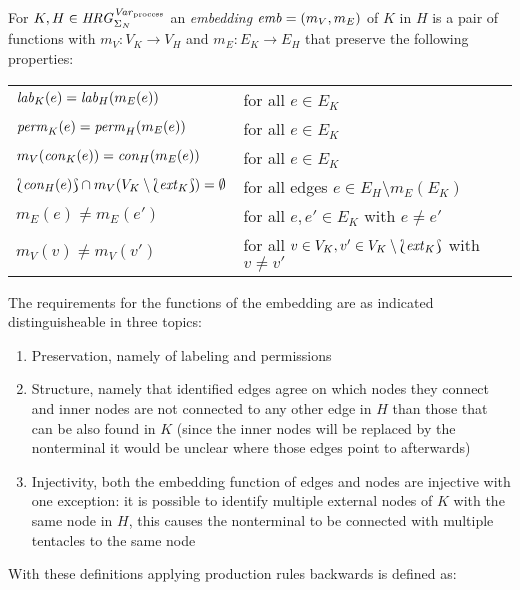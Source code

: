 	\begin{definition}[Embedding]
		For $K,H\in\mathit{HRG}_{\Sigma_{N}}^{\mathit{Var}_{\text{process}}}$ an \emph{embedding} $\mathit{emb} = (m_{V}, m_{E})$ of
		$K$ in $H$ is a pair of functions with $m_{V}:V_{K}\rightarrow V_{H}$
		and $m_{E}:E_{K}\rightarrow E_{H}$ that preserve the following
		properties:
		\begin{center}
			\begin{tabular}{|ll|}
				\hline
				$\mathit{lab}_{K}(e) = \mathit{lab}_{H}(m_{E}(e))$        & for all $e\in E_{K}$\\
				$\mathit{perm}_{K}(e) = \mathit{perm}_{H}(m_{E}(e))$      & for all $e\in E_{K}$\\
				\hline
				$m_{V}(\mathit{con}_{K}(e)) = \mathit{con}_{H}(m_{E}(e))$ & for all $e\in E_{K}$\\
				$\Lbag\mathit{con}_{H}(e)\Rbag\cap m_{V}(V_{K}\setminus\Lbag\mathit{ext}_{K}\Rbag)=
					\emptyset$                             & for all edges
					$e\in E_{H}\setminus m_E(E_{K})$\\
				\hline
				$m_{E}(e) \neq m_{E}(e')$                 & for all $e,e'\in E_{K}$
					with $e\neq e'$\\
				$m_{V}(v)\neq m_{V}(v')$                  & for all $v\in V_{K},
					v'\in V_{K} \setminus\Lbag\mathit{ext}_{K}\Rbag$ with $v\neq v'$\\
				\hline
			\end{tabular}
		\end{center}
	\end{definition}
	The requirements for the functions of the embedding are as
	indicated distinguisheable in three topics:
	\begin{enumerate}
		\item Preservation, namely of labeling and permissions
		\item Structure, namely that identified edges agree on which nodes they
			connect and inner nodes are not connected to any other edge in $H$
			than those that can be also found in $K$ (since the inner nodes will
			be replaced by the nonterminal it would be unclear where those edges
			point to afterwards)
		\item Injectivity, both the embedding function of edges and nodes are
			injective with one exception: it is possible to identify multiple
			external nodes of $K$ with the same node in $H$, this causes the
			nonterminal to be connected with multiple tentacles to the same node
	\end{enumerate}
	With these definitions applying production rules backwards is defined as:
